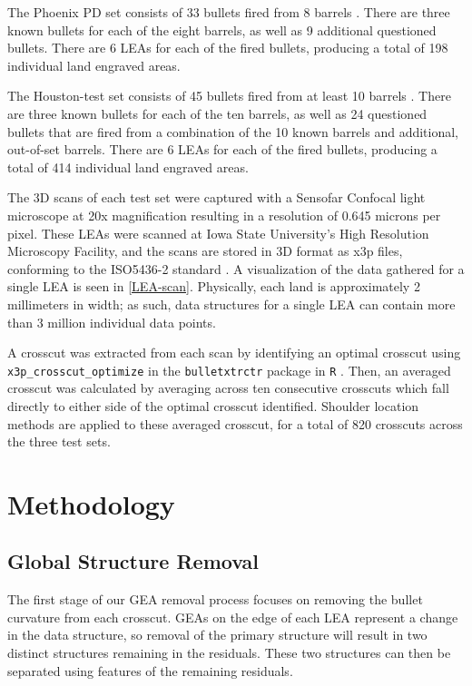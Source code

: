 \documentclass[12pt]{article}
\begin{document}
The Phoenix PD set consists of 33 bullets fired from 8 barrels
. There are three known
bullets for each of the eight barrels, as well as 9 additional
questioned bullets. There are 6 LEAs for each of the fired bullets,
producing a total of 198 individual land engraved areas.

The Houston-test set consists of 45 bullets fired from at least 10
barrels . There are three
known bullets for each of the ten barrels, as well as 24 questioned
bullets that are fired from a combination of the 10 known barrels and
additional, out-of-set barrels. There are 6 LEAs for each of the fired
bullets, producing a total of 414 individual land engraved areas.

The 3D scans of each test set were captured with a Sensofar Confocal
light microscope at 20x magnification resulting in a resolution of 0.645
microns per pixel. These LEAs were scanned at Iowa State University's
High Resolution Microscopy Facility, and the scans are stored in 3D
format as x3p files, conforming to the ISO5436-2 standard
\citep{ISO5436}. A visualization of the data gathered for a single LEA
is seen in \autoref{LEA-scan}. Physically, each land is approximately 2
millimeters in width; as such, data structures for a single LEA can
contain more than 3 million individual data points.

A crosscut was extracted from each scan by identifying an optimal
crosscut using \texttt{x3p\_crosscut\_optimize} in the
\texttt{bulletxtrctr} package in \texttt{R} \cite{bulletxtrctr}. Then,
an averaged crosscut was calculated by averaging across ten consecutive
crosscuts which fall directly to either side of the optimal crosscut
identified. Shoulder location methods are applied to these averaged
crosscut, for a total of 820 crosscuts across the three test sets.

\section{Methodology}

\subsection{Global Structure Removal}

The first stage of our GEA removal process focuses on removing the
bullet curvature from each crosscut. GEAs on the edge of each LEA
represent a change in the data structure, so removal of the primary
structure will result in two distinct structures remaining in the
residuals. These two structures can then be separated using features of
the remaining residuals.
\end{document}

